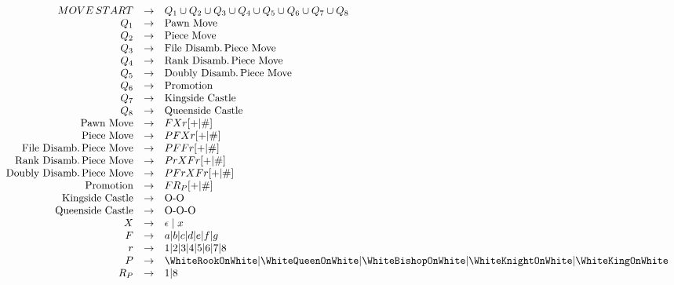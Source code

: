 \documentclass{article}
\begin{document}
\[
\begin{array}{rcl}
  MOVE\,START & \rightarrow & Q_1 \cup Q_2 \cup Q_3 \cup Q_4 \cup Q_5 \cup Q_6 \cup Q_7 \cup Q_8 \\
  Q_1 & \rightarrow & \text{Pawn Move} \\
  Q_2 & \rightarrow & \text{Piece Move} \\
  Q_3 & \rightarrow & \text{File Disamb.\,Piece Move} \\
  Q_4 & \rightarrow & \text{Rank Disamb.\,Piece Move} \\
  Q_5 & \rightarrow & \text{Doubly Disamb.\,Piece Move} \\
  Q_6 & \rightarrow & \text{Promotion} \\
  Q_7 & \rightarrow & \text{Kingside Castle} \\
  Q_8 & \rightarrow & \text{Queenside Castle} \\
  \text{Pawn Move} & \rightarrow & FXr[+|\#] \\
  \text{Piece Move} & \rightarrow & PFXr[+|\#] \\
  \text{File Disamb.\,Piece Move} & \rightarrow & PFFr[+|\#] \\
  \text{Rank Disamb.\,Piece Move} & \rightarrow & PrXFr[+|\#] \\
  \text{Doubly Disamb.\,Piece Move} & \rightarrow & PFrXFr[+|\#] \\
  \text{Promotion} & \rightarrow & FR_P[+|\#] \\
  \text{Kingside Castle} & \rightarrow & \text{O-O} \\
  \text{Queenside Castle} & \rightarrow & \text{O-O-O} \\
  X & \rightarrow & \epsilon \; | \; x \\
  F & \rightarrow & a|b|c|d|e|f|g \\
  r & \rightarrow & 1|2|3|4|5|6|7|8 \\
  P & \rightarrow & \WhiteRookOnWhite|\WhiteQueenOnWhite|\WhiteBishopOnWhite|\WhiteKnightOnWhite|\WhiteKingOnWhite\\
  R_P & \rightarrow & 1|8 
\end{array}
\]
\end{document}
